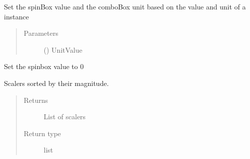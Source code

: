 \documentclass[letterpaper,10pt,english]{sphinxmanual}
\begin{document}
\begin{fulllineitems}
\begin{fulllineitems}
\label{\detokenize{polo.widgets:polo.widgets.unit_combo.UnitComboBox.set_value}}
Set the spinBox value and the comboBox unit based on the value and
unit of a  instance
\begin{quote}\begin{description}
\item[{Parameters}] \leavevmode
{} ({\hyperref[\detokenize{polo.crystallography:polo.crystallography.cocktail.UnitValue}]{}}) \textendash{} UnitValue

\end{description}\end{quote}

\end{fulllineitems}


\begin{fulllineitems}
\label{\detokenize{polo.widgets:polo.widgets.unit_combo.UnitComboBox.set_zero}}
Set the spinbox value to 0

\end{fulllineitems}


\begin{fulllineitems}
\label{\detokenize{polo.widgets:polo.widgets.unit_combo.UnitComboBox.sorted_scalers}}
Scalers sorted by their magnitude.
\begin{quote}\begin{description}
\item[{Returns}] \leavevmode
List of scalers

\item[{Return type}] \leavevmode
list

\end{description}\end{quote}


\end{fulllineitems}
\end{fulllineitems}
\end{document}
